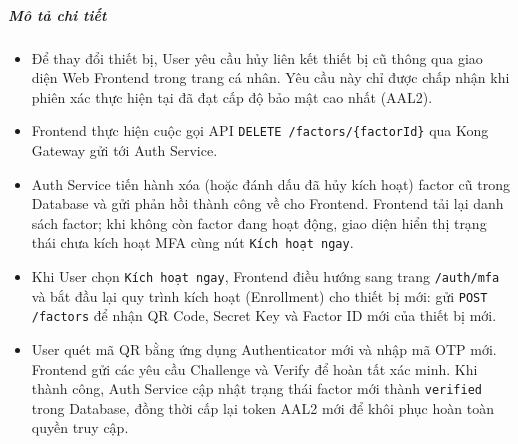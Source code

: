 \subparagraph{Mô tả chi tiết}
\begin{itemize}
\item Để thay đổi thiết bị, User yêu cầu hủy liên kết thiết bị cũ thông qua giao diện Web Frontend trong trang cá nhân. Yêu cầu này chỉ được chấp nhận khi phiên xác thực hiện tại đã đạt cấp độ bảo mật cao nhất (AAL2).
\item Frontend thực hiện cuộc gọi API \texttt{DELETE /factors/\{factorId\}} qua Kong Gateway gửi tới Auth Service.
\item Auth Service tiến hành xóa (hoặc đánh dấu đã hủy kích hoạt) factor cũ trong Database và gửi phản hồi thành công về cho Frontend. Frontend tải lại danh sách factor; khi không còn factor đang hoạt động, giao diện hiển thị trạng thái chưa kích hoạt MFA cùng nút \texttt{Kích hoạt ngay}.
\item Khi User chọn \texttt{Kích hoạt ngay}, Frontend điều hướng sang trang \texttt{/auth/mfa} và bắt đầu lại quy trình kích hoạt (Enrollment) cho thiết bị mới: gửi \texttt{POST /factors} để nhận QR Code, Secret Key và Factor ID mới của thiết bị mới.
\item User quét mã QR bằng ứng dụng Authenticator mới và nhập mã OTP mới. Frontend gửi các yêu cầu Challenge và Verify để hoàn tất xác minh. Khi thành công, Auth Service cập nhật trạng thái factor mới thành \texttt{verified} trong Database, đồng thời cấp lại token AAL2 mới để khôi phục hoàn toàn quyền truy cập.
\end{itemize}
